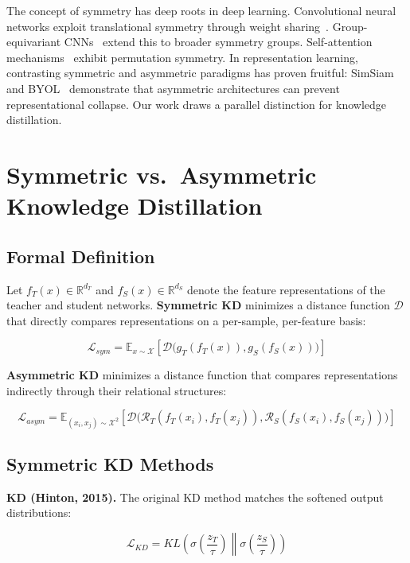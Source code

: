 \documentclass[symmetry,article,submit,pdftex,moreauthors]{Definitions/mdpi}
\begin{document}
The concept of symmetry has deep roots in deep learning. Convolutional neural networks exploit translational symmetry through weight sharing~\cite{ref13}. Group-equivariant CNNs~\cite{ref14} extend this to broader symmetry groups. Self-attention mechanisms~\cite{ref15} exhibit permutation symmetry. In representation learning, contrasting symmetric and asymmetric paradigms has proven fruitful: SimSiam~\cite{ref16} and BYOL~\cite{ref17} demonstrate that asymmetric architectures can prevent representational collapse. Our work draws a parallel distinction for knowledge distillation.

\section{Symmetric vs.~Asymmetric Knowledge Distillation}

\subsection{Formal Definition}

Let $f_T(x) \in \mathbb{R}^{d_T}$ and $f_S(x) \in \mathbb{R}^{d_S}$ denote the feature representations of the teacher and student networks. \textbf{Symmetric KD} minimizes a distance function $\mathcal{D}$ that directly compares representations on a per-sample, per-feature basis:

\begin{equation}
\mathcal{L}_{sym} = \mathbb{E}_{x \sim \mathcal{X}} \left[ \mathcal{D}\big(g_T(f_T(x)), g_S(f_S(x))\big) \right]
\end{equation}

\textbf{Asymmetric KD} minimizes a distance function that compares representations indirectly through their relational structures:

\begin{equation}
\mathcal{L}_{asym} = \mathbb{E}_{(x_i, x_j) \sim \mathcal{X}^2} \left[ \mathcal{D}\big(\mathcal{R}_T(f_T(x_i), f_T(x_j)), \mathcal{R}_S(f_S(x_i), f_S(x_j))\big) \right]
\end{equation}

\subsection{Symmetric KD Methods}

\textbf{KD (Hinton, 2015).} The original KD method matches the softened output distributions:

$$\mathcal{L}_{KD} = KL\left(\sigma\left(\frac{z_T}{\tau}\right) \middle\| \sigma\left(\frac{z_S}{\tau}\right) \right)$$
\end{document}
